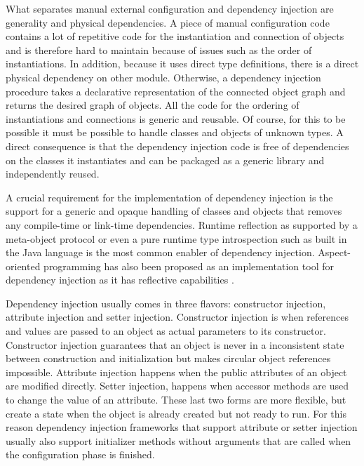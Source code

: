 What separates manual external configuration and dependency injection are generality and physical dependencies.
A piece of manual configuration code contains a lot of repetitive code for the instantiation and connection
of objects and is therefore hard to maintain because of issues such as the order of instantiations. In addition,
because it uses direct type definitions, there is a direct physical dependency on other module. Otherwise,
a dependency injection procedure takes a declarative representation of the connected object graph
and returns the desired graph of objects. All the code for the ordering of instantiations and connections
is generic and reusable. Of course, for this to be possible it must be possible to handle classes and objects
of unknown types. A direct consequence is that the dependency injection code is free of dependencies on
the classes it instantiates and can be packaged as a generic library and independently reused.

A crucial requirement for the implementation of dependency injection is the support for a generic and opaque
handling of classes and objects that removes any compile-time or link-time dependencies. Runtime reflection
as supported by a meta-object protocol \cite{Kiczales} or even a pure runtime type introspection such
as built in the Java language is the most common enabler of dependency injection. Aspect-oriented programming
has also been proposed as an implementation tool for dependency injection as it has reflective capabilities
\cite{Chiba2005}.

Dependency injection usually comes in three flavors: constructor injection, attribute injection and setter injection.
Constructor injection is when references and values are passed to an object as actual parameters to its constructor.
Constructor injection guarantees that an object is never in a inconsistent state between construction and initialization
but makes circular object references impossible. Attribute injection happens when the public attributes of an object are modified
directly. Setter injection, happens when accessor methods are used to change the value of an attribute. These last
two forms are more flexible, but create a state when the object is already created but not ready to run. For this reason
dependency injection frameworks that support attribute or setter injection usually also support initializer methods
without arguments that are called when the configuration phase is finished.

